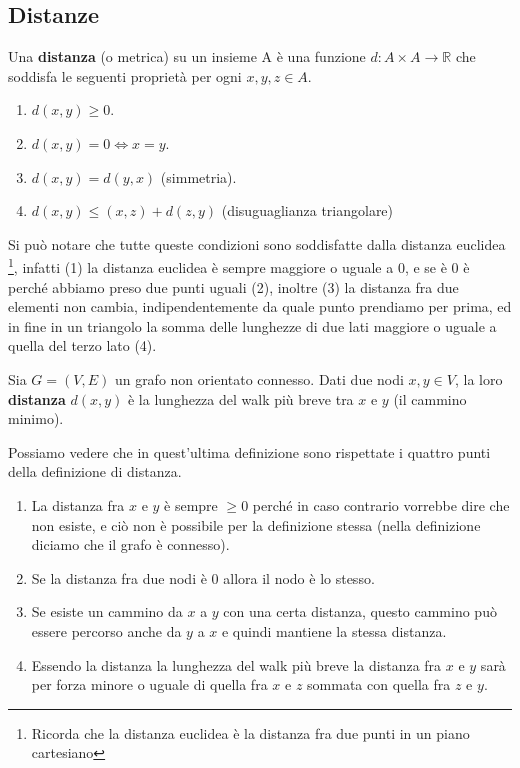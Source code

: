 \subsection{Distanze}
\begin{definition}[Distanza]
    Una \textbf{distanza} (o metrica) su un insieme A è una funzione $d: A \times A \to \mathbb{R}$ che soddisfa le seguenti proprietà per ogni $x,y,z \in A$.
    \begin{enumerate}
        \item $d(x,y) \geq 0$.
        \item $d(x,y) = 0 \Longleftrightarrow x = y$.
        \item $d(x,y) = d(y,x)$ (simmetria).
        \item $d(x,y) \leq (x,z) + d(z,y)$ (disuguaglianza triangolare)
    \end{enumerate}
\end{definition}
Si può notare che tutte queste condizioni sono soddisfatte dalla distanza euclidea \footnote{Ricorda che la distanza euclidea è la distanza fra due punti in un piano cartesiano}, infatti (1) la distanza euclidea è sempre maggiore o uguale a 0, e se è 0 è perché abbiamo preso due punti uguali (2), inoltre (3) la distanza fra due elementi non cambia, indipendentemente da quale punto prendiamo per prima, ed in fine in un triangolo la somma delle lunghezze di due lati  maggiore o uguale a quella del terzo lato (4).

\begin{definition}
    Sia $G = (V,E)$ un grafo non orientato connesso. Dati due nodi $x,y \in V$, la loro \textbf{distanza} $d(x,y)$ è la lunghezza del walk più breve tra $x$ e $y$ (il cammino minimo).
\end{definition}
Possiamo vedere che in quest'ultima definizione sono rispettate i quattro punti della definizione di distanza.
\begin{enumerate}
    \item La distanza fra $x$ e $y$ è sempre $\geq 0$ perché in caso contrario vorrebbe dire che non esiste, e ciò non è possibile per la definizione stessa (nella definizione diciamo che il grafo è connesso).
    \item Se la distanza fra due nodi è $0$ allora il nodo è lo stesso.
    \item Se esiste un cammino da $x$ a $y$ con una certa distanza, questo cammino può essere percorso anche da $y$ a $x$ e quindi mantiene la stessa distanza.
    \item Essendo la distanza la lunghezza del walk più breve la distanza fra $x$ e $y$ sarà per forza minore o uguale di quella fra $x$ e $z$ sommata con quella fra $z$ e $y$.
\end{enumerate}

